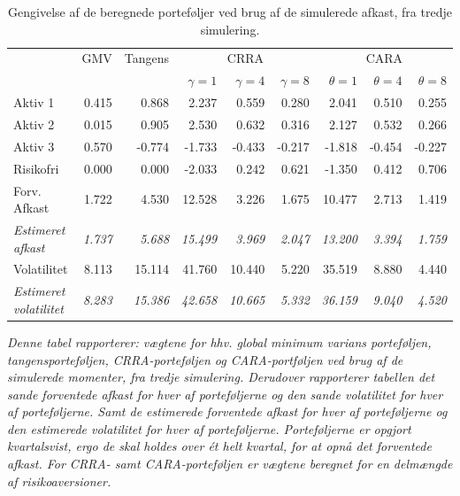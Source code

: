 \documentclass[
  a4paper,
  oneside]{memoir}
\begin{document}
\begin{table}[H]

\caption{\label{tab:sum-3}Gengivelse af de beregnede porteføljer ved brug af de simulerede afkast, fra tredje simulering.}
\centering
\begin{threeparttable}
\begin{tabular}[t]{lrrrrrrrr}
\toprule
\multicolumn{1}{c}{ } & \multicolumn{1}{c}{GMV} & \multicolumn{1}{c}{Tangens} & \multicolumn{3}{c}{CRRA} & \multicolumn{3}{c}{CARA} \\
\cmidrule(l{3pt}r{3pt}){2-2} \cmidrule(l{3pt}r{3pt}){3-3} \cmidrule(l{3pt}r{3pt}){4-6} \cmidrule(l{3pt}r{3pt}){7-9}
  &   &   & $\gamma=1$ & $\gamma=4$ & $\gamma=8$ & $\theta=1$ & $\theta=4$ & $\theta=8$\\
\midrule
\rowcolor{gray!6}  Aktiv 1 & 0.415 & 0.868 & 2.237 & 0.559 & 0.280 & 2.041 & 0.510 & 0.255\\
Aktiv 2 & 0.015 & 0.905 & 2.530 & 0.632 & 0.316 & 2.127 & 0.532 & 0.266\\
\rowcolor{gray!6}  Aktiv 3 & 0.570 & -0.774 & -1.733 & -0.433 & -0.217 & -1.818 & -0.454 & -0.227\\
Risikofri & 0.000 & 0.000 & -2.033 & 0.242 & 0.621 & -1.350 & 0.412 & 0.706\\
\rowcolor{gray!6}  Forv. Afkast & 1.722 & 4.530 & 12.528 & 3.226 & 1.675 & 10.477 & 2.713 & 1.419\\
\em{Estimeret afkast} & \em{1.737} & \em{5.688} & \em{15.499} & \em{3.969} & \em{2.047} & \em{13.200} & \em{3.394} & \em{1.759}\\
\rowcolor{gray!6}  Volatilitet & 8.113 & 15.114 & 41.760 & 10.440 & 5.220 & 35.519 & 8.880 & 4.440\\
\em{Estimeret volatilitet} & \em{8.283} & \em{15.386} & \em{42.658} & \em{10.665} & \em{5.332} & \em{36.159} & \em{9.040} & \em{4.520}\\
\bottomrule
\end{tabular}
\begin{tablenotes}
\item \textit{Denne tabel rapporterer: vægtene for hhv. global minimum varians porteføljen, tangensporteføljen, CRRA-porteføljen og CARA-portføljen ved brug af de simulerede momenter, fra tredje simulering. Derudover rapporterer tabellen det sande forventede afkast for hver af porteføljerne og den sande volatilitet for hver af porteføljerne. Samt de estimerede forventede afkast for hver af porteføljerne og den estimerede volatilitet for hver af porteføljerne. Porteføljerne er opgjort kvartalsvist, ergo de skal holdes over ét helt kvartal, for at opnå det forventede afkast. For CRRA- samt CARA-porteføljen er vægtene beregnet for en delmængde af risikoaversioner.}
\end{tablenotes}
\end{threeparttable}
\end{table}
\end{document}

